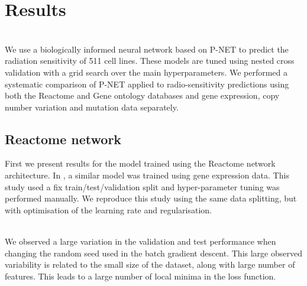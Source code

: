 \documentclass[NOTE, disdraft=true, UKenglish]{\DISCDTLATEXPATH UCLCDTDISdoc}
\begin{document}
\section{Results}
\label{sec:results}
\\
We use a biologically informed neural network based on P-NET \cite{elmarakeby_biologically_2021} to predict the radiation sensitivity of 511 cell lines. These models are tuned using nested cross validation with a grid search over the main hyperparameters. 
We performed a systematic comparison of P-NET applied to radio-sensitivity predictions using both the Reactome \cite{reactome} and Gene ontology \cite{go_1,go_2} databases and gene expression, copy number variation and mutation data separately. 
\subsection{Reactome network}
First we present results for the model trained using the Reactome network architecture. In \cite{cosmin_thesis}, a similar model was trained using gene expression data. This study used a fix train/test/validation split and hyper-parameter tuning was performed manually. 
We reproduce this study using the same data splitting, but with optimisation of the learning rate and regularisation. 

\\ \indent We observed a large variation in the validation and test performance when changing the random seed used in the batch gradient descent.
This large observed variability is related to the small size of the dataset, along with large number of features. This leads to a large number of local minima in the loss function. 
\end{document}
